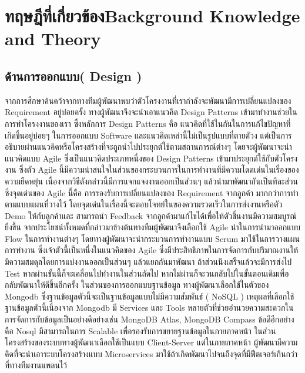 \chapter{\ifcpe ทฤษฎีที่เกี่ยวข้อง\else Background Knowledge and Theory\fi}


\section{ด้านการออกแบบ( Design )}
จากการศึกษาค้นคว้าจากทางทีมผู้พัฒนาพบว่าตัวโครงงานที่เรากำลังจะพัฒนามีการเปลี่ยนแปลงของ Requirement อยู่บ่อยครั้ง  ทางผู้พัฒนาจึงจะนำเอาแนวคิด Design Patterns \cite{designPatterns} เข้ามาทำงานช่วยในการทำโครงงานของเรา 
ซึ่งหลักการ Design Patterns คือ แนวคิดที่ใช้ในกันในการแก้ไขปัญหาที่เกิดขึ้นอยู่บ่อยๆ ในการออกแบบ Software และแนวคิดเหล่านี้ไม่เป็นรูปแบบที่ตายตัวง แต่เป็นการอธิบายผ่านแนวคิดหรือโครงสร้างที่จะถูกนำไปประยุกต์ใช้ตามสถานการณ์ต่างๆ  
โดยจะผู้พัฒนาจะนำแนวคิดแบบ Agile \cite{agile}  ซึ่งเป็นแนวคิดประเภทหนึ่งของ Design Patterns เข้ามาประยุกต์ใช้กับตัวโครงงาน   ซึ่งตัว Agile นี้มีความน่าสนใจในส่วนของกระบวนการในการทำงานที่มีความโดดเด่นในเรื่องของความยืดหยุ่น  เนื่องจากวิธีดังกล่าวนี้มีการแจกแจงงานออกเป็นส่วนๆ  แล้วนำมาพัฒนากันเป็นทีละส่วน  
ซึ่งจุดเด่นของ Agile นี้คือ การรองรับการเปลี่ยนแปลงของ Requirement จากลูกค้า มากกว่าการทำตามแบบแผนที่วางไว้  โดยจุดเด่นในเรื่องนี้จะตอบโจทย์ในของความรวดเร็วในการส่งงานหรือตัว Demo ให้กับลูกค้าและ สามารถนำ Feedback จากลูกค้ามาแก้ไขได้เพื่อให้ตัวชิ้นงานมีความสมบูรณ์ยิ่งขึ้น 
 จากประโยชน์ทั้งหมดที่กล่าวมาข้างต้นทางทีมผู้พัฒนาจึงเลือกใช้ Agile นำในการนำมาออกแบบ Flow ในการทำงานต่างๆ  โดยทางผู้พัฒนาจะนำกระบวนการทำงานแบบ Scrum \cite{srcum} มาใช้ในการวางแผนการทำงาน 
ซึ่งเจ้าตัวนี้เป็นหนึ่งในแนวคิดของ Agile ซึ่งมีประสิทธิภาพในการจัดการกับปริมาณงานให้มีความสมดุลโดยการแบ่งงานออกเป็นส่วนๆ แล้วแยกกันมาพัฒนา  ถ้าส่วนนึงเสร็จแล้วจะมีการส่งไป Test  หากผ่านขั้นนี้ก็จะเคลื่อนไปทำงานในส่วนถัดไป  หากไม่ผ่านก็จะวนกลับไปในขั้นตอนเดิมเพื่อกลับพัฒนาให้ดีขึ้นอีกครั้ง  
ในส่วนของการออกแบบฐานข้อมูล ทางผู้พัฒนาเลือกใช้ในตัวของ Mongodb \cite{MongoDB} ซึ่งฐานข้อมูลตัวนี้จะเป็นฐานข้อมูลแบบไม่มีความสัมพันธ์ ( NoSQL ) 
เหตุผลที่เลือกใช้ฐานข้อมูลตัวนี้เนื่องจาก Mongodb มี Services และ Tools หลายตัวที่ช่วยอำนวยความสะดวกในการจัดการกับข้อมูลเป็นอย่างดีอย่างเช่น MongoDB Atlas, MongoDB Compass 
ข้อดีอีกอย่างคือ Nosql มีสามารถในการ Scalable เพื่อรองรับการขยายฐานข้อมูลในภายภาคหน้า  ในส่วนโครงสร้างของระบบทางผู้พัฒนาเลือกใช้เป็นแบบ Client-Server \cite{Client-Server} แต่ในภายภาคหน้า  ผู้พัฒนามีความคิดที่จะนำเอาระบบโครงสร้างแบบ Microservices \cite{Microservice}มาใช้ถ้าเกิดพัฒนาไปจนถึงจุดที่มีฟีตเจอร์เกินกว่าที่ทางทีมงานแพลนไว้  
